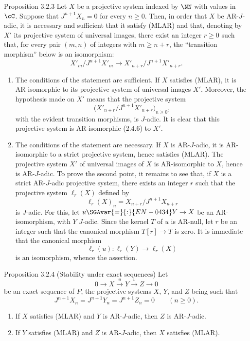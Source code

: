 \begin{statement}{Proposition 3.2.3}
Let $X$ be a projective system indexed by $\NN$ with values in $\cC$. Suppose that $J^{n+1}X_n=0$ for every $n\ge0$. Then, in order that $X$ be AR-$J$-adic, it is necessary and sufficient that it satisfy (MLAR) and that, denoting by $X'$ its projective system of universal images, there exist an integer $r\ge0$ such that, for every pair $(m,n)$ of integers with $m\ge n+r$, the ``transition morphism'' below is an isomorphism:
\[
X'_m/J^{n+1}X'_m\longrightarrow X'_{n+r}/J^{n+1}X'_{n+r}.
\]
\end{statement}

\begin{prooftext}[Proof]
\begin{enumerate}[label=(\alph*)]
\item The conditions of the statement are sufficient. If $X$ satisfies (MLAR), it is AR-isomorphic to its projective system of universal images $X'$. Moreover, the hypothesis made on $X'$ means that the projective system
\[
\bigl(X'_{n+r}/J^{n+1}X'_{n+r}\bigr)_{n\ge0},
\]
with the evident transition morphisms, is $J$-adic. It is clear that this projective system is AR-isomorphic (2.4.6) to $X'$.
\item The conditions of the statement are necessary. If $X$ is AR-$J$-adic, it is AR-isomorphic to a strict projective system, hence satisfies (MLAR). The projective system $X'$ of universal images of $X$ is AR-isomorphic to $X$, hence is AR-$J$-adic. To prove the second point, it remains to see that, if $X$ is a strict AR-$J$-adic projective system, there exists an integer $r$ such that the projective system $\ell_r(X)$ defined by
\[
\ell_r(X)_n=X_{n+r}/J^{n+1}X_{n+r}
\]
is $J$-adic. For this, let $u\SGAvar{=}{:}{EN-0434}Y\to X$ be an AR-isomorphism, with $Y$ $J$-adic. Since the kernel $T$ of $u$ is AR-null, let $r$ be an integer such that the canonical morphism $T[r]\to T$ is zero. It is immediate that the canonical morphism
\[
\ell_r(u):\ell_r(Y)\longrightarrow\ell_r(X)
\]
is an isomorphism, whence the assertion.
\end{enumerate}
\end{prooftext}

\begin{statement}{Proposition 3.2.4 (Stability under exact sequences)}
Let
\[
0\longrightarrow X\stackrel{u}{\longrightarrow}Y\stackrel{v}{\longrightarrow}Z\longrightarrow0
\]
be an exact sequence of $P$, the projective systems $X$, $Y$, and $Z$ being such that
\[
J^{n+1}X_n=J^{n+1}Y_n=J^{n+1}Z_n=0\qquad(n\ge0).
\]
\begin{enumerate}[label=(\roman*)]
\item If $X$ satisfies (MLAR) and $Y$ is AR-$J$-adic, then $Z$ is AR-$J$-adic.
\item If $Y$ satisfies (MLAR) and $Z$ is AR-$J$-adic, then $X$ satisfies (MLAR).
\end{enumerate}
\end{statement}

